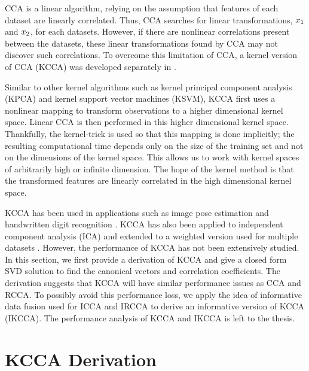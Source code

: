 CCA is a linear algorithm, relying on the assumption that features of each dataset are
linearly correlated. Thus, CCA searches for linear transformations, $x_1$ and $x_2$, for
each datasets. However, if there are nonlinear correlations present between the datasets,
these linear transformations found by CCA may not discover such correlations. To overcome
this limitation of CCA, a kernel version of CCA (KCCA) was developed separately in
\cite{akaho2006kernel,melzer2001kernel}.

Similar to other kernel algorithms such as kernel principal component analysis (KPCA) and
kernel support vector machines (KSVM), KCCA first uses a nonlinear mapping to transform
observations to a higher dimensional kernel space. Linear CCA is then performed in this
higher dimensional kernel space. Thankfully, the kernel-trick is used so that this mapping
is done implicitly; the resulting computational time depends only on the size of the
training set and not on the dimensions of the kernel space. This allows us to work with
kernel spaces of arbitrarily high or infinite dimension. The hope of the kernel method is
that the transformed features are linearly correlated in the high dimensional kernel
space.

KCCA has been used in applications such as image pose estimation \cite{melzer2001kernel}
and handwritten digit recognition \cite{yu2007learning}. KCCA has also been applied to
independent component analysis (ICA) \cite{fyfe2000ica} and extended to a weighted version
used for multiple datasets \cite{yu2007learning}. However, the performance of KCCA has not
been extensively studied. In this section, we first provide a derivation of KCCA and give
a closed form SVD solution to find the canonical vectors and correlation coefficients. The
derivation suggests that KCCA will have similar performance issues as CCA and RCCA. To
possibly avoid this performance loss, we apply the idea of informative data fusion used
for ICCA and IRCCA to derive an informative version of KCCA (IKCCA). The performance
analysis of KCCA and IKCCA is left to the thesis.

\section{KCCA Derivation}

